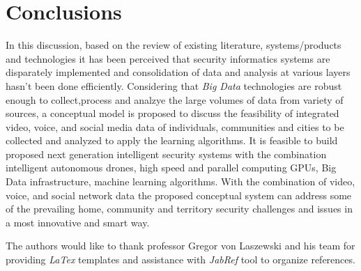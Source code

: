 \documentclass[sigconf]{acmart}
\begin{document}
\section{Conclusions}
In this discussion, based on the review of existing literature, systems/products and technologies it has been perceived that security informatics systems are disparately implemented and consolidation of data and analysis at various layers hasn't been done efficiently. Considering that \textit{Big Data} technologies are robust enough to collect,process and analzye the large volumes of data from variety of sources, a conceptual model is proposed to discuss the feasibility of integrated video, voice, and social media data of individuals, communities and cities to be collected and analyzed to apply the learning algorithms. It is feasible to build proposed next generation intelligent security systems with the combination intelligent autonomous drones, high speed and parallel computing GPUs, Big Data infrastructure, machine learning algorithms. With the combination of video, voice, and social network data the proposed conceptual system can address some of the prevailing home, community and territory security challenges and issues in a most innovative and smart way.

\begin{acks}
The authors would like to thank professor Gregor von Laszewski and his team for providing \textit{LaTex} templates and assistance with \textit{JabRef} tool to organize references.
\end{acks}


 
\end{document}
